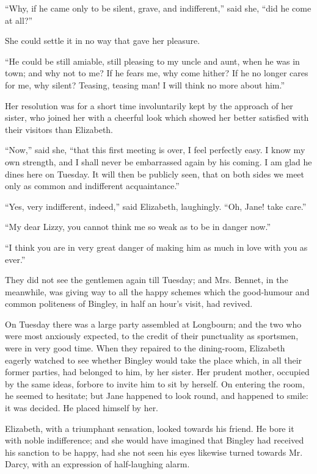 \documentclass[12pt,openright]{book}
\begin{document}
“Why, if he came only to be silent, grave, and indifferent,” said she, “did he come at all?”

She could settle it in no way that gave her pleasure.

“He could be still amiable, still pleasing to my uncle and aunt, when he was in town; and why not to me? If he fears me, why come hither? If he no longer cares for me, why silent? Teasing, teasing man! I will think no more about him.”

Her resolution was for a short time involuntarily kept by the approach of her sister, who joined her with a cheerful look which showed her better satisfied with their visitors than Elizabeth.

“Now,” said she, “that this first meeting is over, I feel perfectly easy. I know my own strength, and I shall never be embarrassed again by his coming. I am glad he dines here on Tuesday. It will then be publicly seen, that on both sides we meet only as common and indifferent acquaintance.”

“Yes, very indifferent, indeed,” said Elizabeth, laughingly. “Oh, Jane! take care.”

“My dear Lizzy, you cannot think me so weak as to be in danger now.”

“I think you are in very great danger of making him as much in love with you as ever.”

They did not see the gentlemen again till Tuesday; and Mrs. Bennet, in the meanwhile, was giving way to all the happy schemes which the good-humour and common politeness of Bingley, in half an hour’s visit, had revived.

On Tuesday there was a large party assembled at Longbourn; and the two who were most anxiously expected, to the credit of their punctuality as sportsmen, were in very good time. When they repaired to the dining-room, Elizabeth eagerly watched to see whether Bingley would take the place which, in all their former parties, had belonged to him, by her sister. Her prudent mother, occupied by the same ideas, forbore to invite him to sit by herself. On entering the room, he seemed to hesitate; but Jane happened to look round, and happened to smile: it was decided. He placed himself by her.

Elizabeth, with a triumphant sensation, looked towards his friend. He bore it with noble indifference; and she would have imagined that Bingley had received his sanction to be happy, had she not seen his eyes likewise turned towards Mr. Darcy, with an expression of half-laughing alarm.
\end{document}
